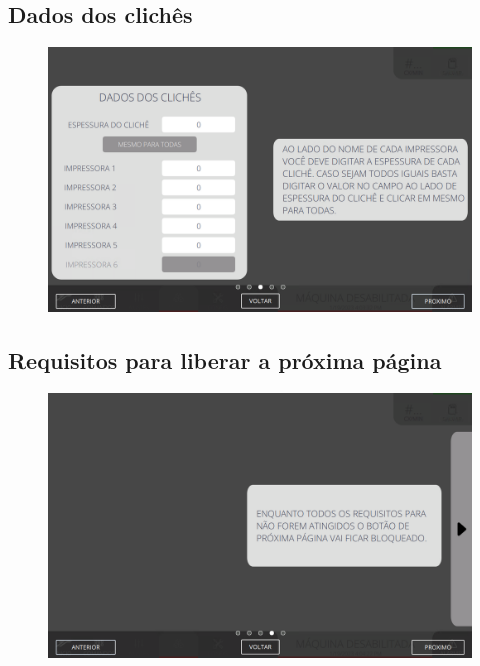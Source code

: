 \thispagestyle{fancy}
\vspace{\fill}
\subsection{\small Dados dos clichês}
\begin{figure}
    \centering
    \includegraphics[width=576 px,height=360 px]{src/imagesICV/09-request/new/e-3.png}
\end{figure}
\newpage

\thispagestyle{fancy}
\vspace{\fill}
\subsection{\small Requisitos para liberar a próxima página}
\begin{figure}
    \centering
    \includegraphics[width=576 px,height=360 px]{src/imagesICV/09-request/new/e-4-COM-ERRO-DIGITAÇÃO.png}
\end{figure}
\newpage

